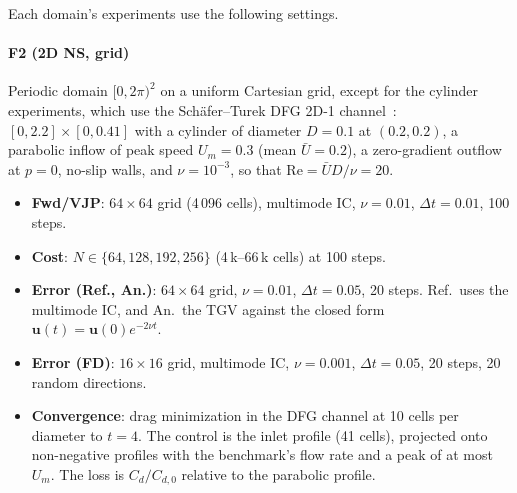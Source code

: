 Each domain's experiments use the following settings.

\paragraph{F2 (2D NS, grid)}
Periodic domain $[0,2\pi)^2$ on a uniform Cartesian grid, except for the
cylinder experiments, which use the Sch\"afer--Turek DFG 2D-1
channel~\cite{schafer1996benchmark}: $[0,2.2]\times[0,0.41]$ with a cylinder of
diameter $D=0.1$ at $(0.2,0.2)$, a parabolic inflow of peak speed $U_m=0.3$
(mean $\bar{U}=0.2$), a zero-gradient outflow at $p=0$, no-slip walls, and
$\nu=10^{-3}$, so that $\mathrm{Re}=\bar{U}D/\nu=20$.
\begin{itemize}\itemsep0pt
  \item \textbf{Fwd/VJP}: $64\times64$ grid (4\,096 cells), multimode IC,
        $\nu=0.01$, $\Delta t=0.01$, 100 steps.
  \item \textbf{Cost}: $N\in\{64,128,192,256\}$ (4\,k--66\,k cells) at 100 steps.
  \item \textbf{Error (Ref., An.)}: $64\times64$ grid, $\nu=0.01$,
        $\Delta t=0.05$, 20 steps. Ref.\ uses the multimode IC, and An.\ the TGV
        against the closed form $\mathbf{u}(t)=\mathbf{u}(0)e^{-2\nu t}$.
  \item \textbf{Error (FD)}: $16\times16$ grid, multimode IC, $\nu=0.001$,
        $\Delta t=0.05$, 20 steps, 20 random directions.
  \item \textbf{Convergence}: drag minimization in the DFG channel at 10 cells
        per diameter to $t=4$. The control is the inlet profile (41 cells),
        projected onto non-negative profiles with the benchmark's flow rate and
        a peak of at most $U_m$. The loss is $C_d/C_{d,0}$ relative to the
        parabolic profile.
\end{itemize}

